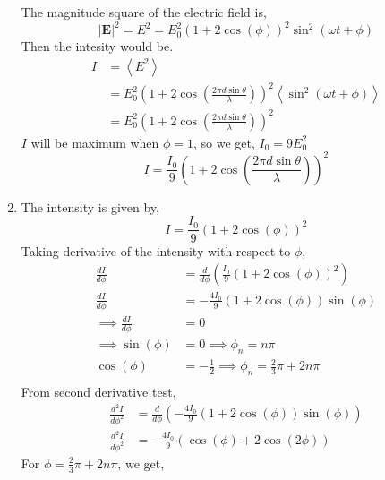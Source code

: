 \documentclass{article}
\begin{document}
\begin{problem}[Intensity]
\begin{enumerate}
	      The magnitude square of the electric field is,
	      \[|\mathbf{E}|^2=E^2=E^2_0\left(1+2\cos{\left(\phi\right)}\right)^2\sin^2{\left(\omega t+\phi\right)}\]
	      Then the intesity would be.
	      \begin{align*}
		      I & = \left<E^2\right>                                                                                                            \\
		        & = E^2_0\left(1+2\cos{\left(\frac{2\pi d\sin{\theta}}{\lambda}\right)}\right)^2\left<\sin^2{\left(\omega t+\phi\right)}\right> \\
		        & = E^2_0\left(1+2\cos{\left(\frac{2\pi d\sin{\theta}}{\lambda}\right)}\right)^2
	      \end{align*}
	      \(I\) will be maximum when \(\phi=1\), so we get, \(I_0 = 9E^2_0\)
	      \[I = \frac{I_0}{9}\left(1+2\cos{\left(\frac{2\pi d\sin{\theta}}{\lambda}\right)}\right)^2\]
	\item The intensity is given by,
	      \[I = \frac{I_0}{9}\left(1+2\cos{\left(\phi\right)}\right)^2\]
	      Taking derivative of the intensity with respect to \(\phi\),
	      \begin{align*}
		      \frac{dI}{d\phi}                 & = \frac{d}{d\phi}\left(\frac{I_0}{9}\left(1+2\cos{\left(\phi\right)}\right)^2\right) \\
		      \frac{dI}{d\phi}                 & = -\frac{4I_0}{9}(1+2\cos{\left(\phi\right)})\sin{\left(\phi\right)}                 \\
		      \implies \frac{dI}{d\phi}        & = 0                                                                                  \\
		      \implies \sin{\left(\phi\right)} & = 0 \implies \phi_n = n\pi                                                           \\
		      \cos{\left(\phi\right)}          & = -\frac{1}{2} \implies \phi_n=\frac{2}{3}\pi+2n\pi                                  \\
	      \end{align*}
	      From second derivative test,
	      \begin{align*}
		      \frac{d^2I}{d\phi^2} & = \frac{d}{d\phi}\left(-\frac{4I_0}{9}(1+2\cos{\left(\phi\right)})\sin{\left(\phi\right)}\right) \\
		      \frac{d^2I}{d\phi^2} & = -\frac{4I_0}{9}\left(\cos{(\phi)}+2\cos{(2\phi)}\right)
	      \end{align*}
	      For \(\phi=\frac{2}{3}\pi+2n\pi\), we get,

\end{enumerate}
\end{problem}
\end{document}
